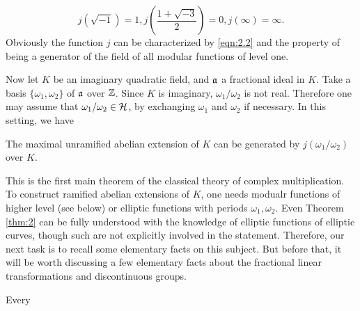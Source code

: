 \begin{equation}
    \label{eqn:2.2}
    j(\sqrt{-1}) = 1, j\left(\frac{1 + \sqrt{-3}}{2}\right) = 0, j(\infty) = \infty.
\end{equation}
Obviously the function $j$ can be characterized by \eqref{eqn:2.2} and the property of being a generator of the field of all modular functions of level one.

Now let $K$ be an imaginary quadratic field, and $\mathfrak{a}$ a fractional ideal in $K$. Take a basis $\{\omega_1, \omega_2\}$ of $\mathfrak{a}$ over $\mathbb{Z}$.
Since $K$ is imaginary, $\omega_1 / \omega_2$ is not real. Therefore one may assume that $\omega_1 / \omega_2 \in \mathcal{H}$, by exchanging $\omega_1$ and $\omega_2$ if necessary. In this setting, we have

\begin{theorem}
\label{thm:2}
The maximal unramified abelian extension of $K$ can be generated by $j(\omega_1 / \omega_2)$ over $K$.
\end{theorem}

This is the first main theorem of the classical theory of complex multiplication. To construct ramified abelian extensions of $K$, one needs modualr functions of higher level (see below) or elliptic functions with periods $\omega_1, \omega_2$.
Even Theorem \ref{thm:2} can be fully understood with the knowledge of elliptic functions of elliptic curves, though such are not explicitly involved in the statement. Therefore, our next task is to recall some elementary facts on this subject. But before that, it will be worth discussing a few elementary facts about the fractional linear transformations and discontinuous groups.

Every 